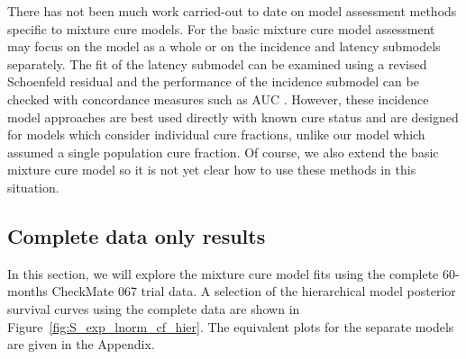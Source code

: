 \documentclass[AMA,STIX1COL]{WileyNJD-v2}
\begin{document}


There has not been much work carried-out to date on model assessment methods specific to mixture cure models.
For the basic mixture cure model assessment may focus on the model as a whole or on the incidence and latency submodels separately.
The fit of the latency submodel can be examined using a revised Schoenfeld residual \cite{Wileyto2013} and the performance of the incidence submodel can be checked with concordance measures such as AUC \cite{Peng2021}.
However, these incidence model approaches are best used directly with known cure status and are designed for models which consider individual cure fractions, unlike our model which assumed a single population cure fraction.
Of course, we also extend the basic mixture cure model so it is not yet clear how to use these methods in this situation. 
%
\subsection{Complete data only results} \label{sec:results}
In this section, we will explore the mixture cure model fits using the complete 60-months CheckMate 067 trial data.
A selection of the hierarchical model posterior survival curves using the complete data are shown in Figure~\ref{fig:S_exp_lnorm_cf_hier}.
The equivalent plots for the separate models are given in the Appendix.
\end{document}
